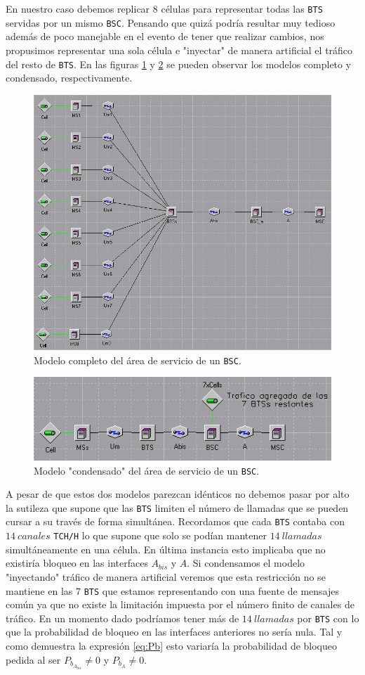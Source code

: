 \documentclass[10pt]{article}
\begin{document}
				En nuestro caso debemos replicar $8$ células para representar todas las \texttt{BTS} servidas por un mismo \texttt{BSC}. Pensando que quizá podría resultar muy tedioso además de poco manejable en el evento de tener que realizar cambios, nos propusimos representar una sola célula e "inyectar" de manera artificial el tráfico del resto de \texttt{BTS}. En las figuras \ref{f:full_bsc_area} y \ref{f:condensed_bsc_area} se pueden observar los modelos completo y condensado, respectivamente.

				\begin{figure}
					\centering
					\includegraphics[width=0.5\linewidth]{full_bsc_area.png}
					\caption{Modelo completo del área de servicio de un \texttt{BSC}.}
					\label{f:full_bsc_area}
				\end{figure}

				\begin{figure}
					\centering
					\includegraphics[width=0.5\linewidth]{condensed_bsc_area.png}
					\caption{Modelo "condensado" del área de servicio de un \texttt{BSC}.}
					\label{f:condensed_bsc_area}
				\end{figure}

				A pesar de que estos dos modelos parezcan idénticos no debemos pasar por alto la sutileza que supone que las \texttt{BTS} limiten el número de llamadas que se pueden cursar a su través de forma simultánea. Recordamos que cada \texttt{BTS} contaba con $14\ canales$ \texttt{TCH/H} lo que supone que solo se podían mantener $14\ llamadas$ simultáneamente en una célula. En última instancia esto implicaba que no existiría bloqueo en las interfaces $A_{bis}$ y $A$. Si condensamos el modelo "inyectando" tráfico de manera artificial veremos que esta restricción no se mantiene en las $7$ \texttt{BTS} que estamos representando con una fuente de mensajes común ya que no existe la limitación impuesta por el número finito de canales de tráfico. En un momento dado podríamos tener más de $14\ llamadas$ por \texttt{BTS} con lo que la probabilidad de bloqueo en las interfaces anteriores no sería nula. Tal y como demuestra la expresión \ref{eq:Pb} esto variaría la probabilidad de bloqueo pedida al ser $P_{b_{A_{bis}}} \neq 0$ y $P_{b_A} \neq 0$.
\end{document}
